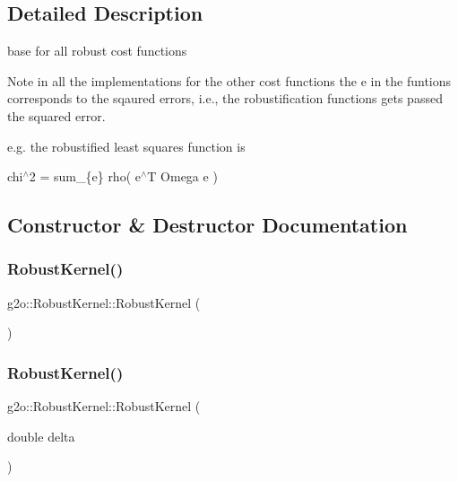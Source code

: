 \subsection{Detailed Description}
base for all robust cost functions 

Note in all the implementations for the other cost functions the e in the funtions corresponds to the sqaured errors, i.\+e., the robustification functions gets passed the squared error.

e.\+g. the robustified least squares function is

chi$^\wedge$2 = sum\+\_\+\{e\} rho( e$^\wedge$\+T Omega e ) 

\subsection{Constructor \& Destructor Documentation}
\mbox{\label{classg2o_1_1_robust_kernel_ae4f7b1e9d0c9925f98c0b828f554a8ab}} 
\subsubsection{\texorpdfstring{Robust\+Kernel()}{RobustKernel()}\hspace{0.1cm}{\footnotesize\ttfamily [1/2]}}
{\footnotesize\ttfamily g2o\+::\+Robust\+Kernel\+::\+Robust\+Kernel (\begin{DoxyParamCaption}{ }\end{DoxyParamCaption})}

\mbox{\label{classg2o_1_1_robust_kernel_aabd6883d9c5e33b567453585a80c7ad8}} 
\subsubsection{\texorpdfstring{Robust\+Kernel()}{RobustKernel()}\hspace{0.1cm}{\footnotesize\ttfamily [2/2]}}
{\footnotesize\ttfamily g2o\+::\+Robust\+Kernel\+::\+Robust\+Kernel (\begin{DoxyParamCaption}\item[{double}]{delta }\end{DoxyParamCaption})\hspace{0.3cm}{\ttfamily [explicit]}}

